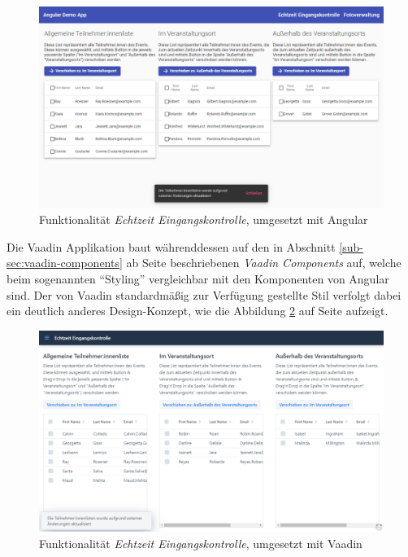 \documentclass[a4paper,12pt,twoside]{scrreprt}
\begin{document}
\begin{figure}[ht]
    \centering
    \includegraphics[scale=0.4]{images/Luidold_Results-Angular-EntranceControl-Snackbar.png}
    \caption[Funktionalität \textit{Echtzeit Eingangskontrolle}, umgesetzt mit Angular]{Funktionalität \textit{Echtzeit Eingangskontrolle}, umgesetzt mit Angular}
    \label{fig:results-angular-ec-snackbar}
\end{figure}

Die Vaadin Applikation baut währenddessen auf den in Abschnitt \ref{sub-sec:vaadin-components} ab Seite \pageref{sub-sec:vaadin-components} beschriebenen \textit{Vaadin Components} auf, welche beim sogenannten \enquote{Styling} vergleichbar mit den Komponenten von Angular sind. Der von Vaadin standardmäßig zur Verfügung gestellte Stil verfolgt dabei ein deutlich anderes Design-Konzept, wie die Abbildung \ref{fig:results-vaadin-ec-snackbar} auf Seite \pageref{fig:results-vaadin-ec-snackbar} aufzeigt.

\begin{figure}[ht]
    \centering
    \includegraphics[scale=0.4]{images/Luidold_Results-Vaadin-EntranceControl-Snackbar.png}
    \caption[Funktionalität \textit{Echtzeit Eingangskontrolle}, umgesetzt mit Vaadin]{Funktionalität \textit{Echtzeit Eingangskontrolle}, umgesetzt mit Vaadin}
    \label{fig:results-vaadin-ec-snackbar}
\end{figure}
\end{document}
